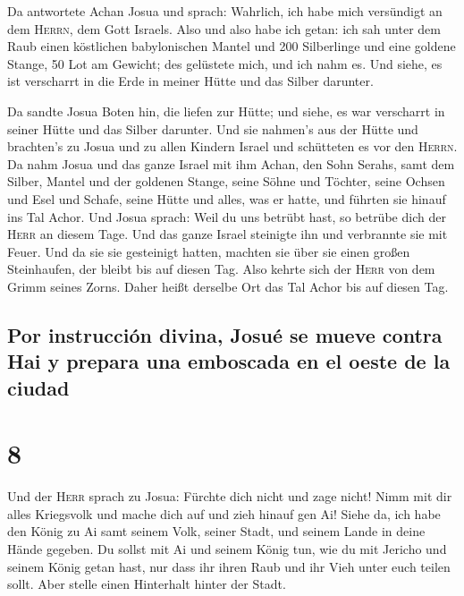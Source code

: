  Da antwortete Achan Josua und sprach: Wahrlich, ich habe
mich versündigt an dem \textsc{Herrn}, dem Gott Israels. Also und also
habe ich getan:  ich sah unter dem Raub einen köstlichen
babylonischen Mantel und 200 Silberlinge und eine goldene Stange, 50 Lot
am Gewicht; des gelüstete mich, und ich nahm es. Und siehe, es ist
verscharrt in die Erde in meiner Hütte und das Silber darunter.

 Da sandte Josua Boten hin, die liefen zur Hütte; und
siehe, es war verscharrt in seiner Hütte und das Silber darunter.
 Und sie nahmen's aus der Hütte und brachten's zu Josua
und zu allen Kindern Israel und schütteten es vor den \textsc{Herrn}.
 Da nahm Josua und das ganze Israel mit ihm Achan, den
Sohn Serahs, samt dem Silber, Mantel und der goldenen Stange, seine
Söhne und Töchter, seine Ochsen und Esel und Schafe, seine Hütte und
alles, was er hatte, und führten sie hinauf ins Tal Achor.
 Und Josua sprach: Weil du uns betrübt hast, so betrübe
dich der \textsc{Herr} an diesem Tage. Und das ganze Israel steinigte
ihn und verbrannte sie mit Feuer. Und da sie sie gesteinigt hatten,
 machten sie über sie einen großen Steinhaufen, der
bleibt bis auf diesen Tag. Also kehrte sich der \textsc{Herr} von dem
Grimm seines Zorns. Daher heißt derselbe Ort das Tal Achor bis auf
diesen Tag.

\hypertarget{por-instrucciuxf3n-divina-josuuxe9-se-mueve-contra-hai-y-prepara-una-emboscada-en-el-oeste-de-la-ciudad}{%
\subsection{Por instrucción divina, Josué se mueve contra Hai y prepara
una emboscada en el oeste de la
ciudad}\label{por-instrucciuxf3n-divina-josuuxe9-se-mueve-contra-hai-y-prepara-una-emboscada-en-el-oeste-de-la-ciudad}}

\hypertarget{section-7}{%
\section{8}\label{section-7}}

 Und der \textsc{Herr} sprach zu Josua: Fürchte dich nicht
und zage nicht! Nimm mit dir alles Kriegsvolk und mache dich auf und
zieh hinauf gen Ai! Siehe da, ich habe den König zu Ai samt seinem Volk,
seiner Stadt, und seinem Lande in deine Hände gegeben.  Du
sollst mit Ai und seinem König tun, wie du mit Jericho und seinem König
getan hast, nur dass ihr ihren Raub und ihr Vieh unter euch teilen
sollt. Aber stelle einen Hinterhalt hinter der Stadt.

